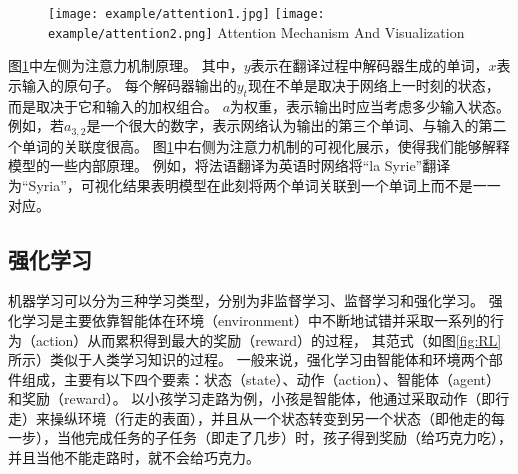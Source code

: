 \begin{figure}[htbp]
  \centering
  \texttt{[image: example/attention1.jpg]}
  \texttt{[image: example/attention2.png]}
    {Attention Mechanism And Visualization}
\label{fig:attention} 
\end{figure}

图\ref{fig:attention}中左侧为注意力机制原理。
其中，$y$表示在翻译过程中解码器生成的单词，$x$表示输入的原句子。
每个解码器输出的$y_t$现在不单是取决于网络上一时刻的状态，而是取决于它和输入的加权组合。
$a$为权重，表示输出时应当考虑多少输入状态。
例如，若$a_{3,2}$是一个很大的数字，表示网络认为输出的第三个单词、与输入的第二个单词的关联度很高。
图\ref{fig:attention}中右侧为注意力机制的可视化展示，使得我们能够解释模型的一些内部原理。
例如，将法语翻译为英语时网络将“la Syrie”翻译为“Syria”，可视化结果表明模型在此刻将两个单词关联到一个单词上而不是一一对应。


\subsection{强化学习}

机器学习可以分为三种学习类型，分别为非监督学习、监督学习和强化学习。
强化学习是主要依靠智能体在环境（environment）中不断地试错并采取一系列的行为（action）从而累积得到最大的奖励（reward）的过程，
其范式（如图\ref{fig:RL}所示）类似于人类学习知识的过程。
一般来说，强化学习由智能体和环境两个部件组成，主要有以下四个要素：状态（state）、动作（action）、智能体（agent）和奖励（reward）。
以小孩学习走路为例，小孩是智能体，他通过采取动作（即行走）来操纵环境（行走的表面），并且从一个状态转变到另一个状态（即他走的每一步），当他完成任务的子任务（即走了几步）时，孩子得到奖励（给巧克力吃），并且当他不能走路时，就不会给巧克力。

